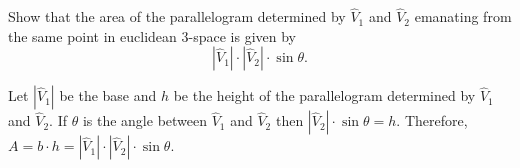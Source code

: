 \documentclass{ximera}
\begin{document}
\begin{problem}
Show that the area of the parallelogram determined by $\hat{V}_{1}$ and
$\hat{V}_{2}$ emanating from the same point in euclidean $3$-space is given by%
\[
|\hat{V}_{1}|\cdot|\hat{V}_{2}|\cdot\sin\theta.
\]


\begin{freeResponse}

Let $|\hat{V}_{1}|$ be the base and $h$ be the height of the parallelogram determined by  $\hat{V}_{1}$ and $\hat{V}_{2}$.  If $\theta$ is the angle between $\hat{V}_{1}$ and $\hat{V}_{2}$ then $|\hat{V}_{2}|\cdot \sin\theta = h$. Therefore, $A = b \cdot h = |\hat{V}_{1}| \cdot |\hat{V}_{2}| \cdot\sin\theta$.

\end{freeResponse}
\end{problem}
\end{document}
